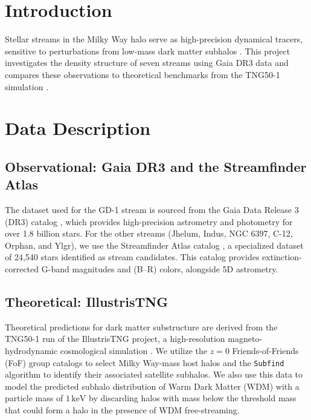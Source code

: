 \documentclass[10pt,onecolumn]{article}
\begin{document}
\section{Introduction}
\vspace{-0.1cm}
Stellar streams in the Milky Way halo serve as high-precision dynamical tracers, sensitive to perturbations from low-mass dark matter subhalos \citep{Bonaca2025}. This project investigates the density structure of seven streams using Gaia DR3 data \citep{Vallenari2023} and compares these observations to theoretical benchmarks from the TNG50-1 simulation \citep{Nelson2019}.

\section{Data Description}

\subsection{Observational: Gaia DR3 and the Streamfinder Atlas}

The dataset used for the GD-1 stream \citep{Grillmair2006,Price2018} is sourced from the Gaia Data Release 3 (DR3) catalog \citep{Vallenari2023}, which provides high-precision astrometry and photometry for over 1.8 billion stars. For the other streams (Jhelum, Indus, NGC 6397, C-12, Orphan, and Ylgr), we use the Streamfinder Atlas catalog \citep{Malhan2018, Ibata2024}, a specialized dataset of 24,540 stars identified as stream candidates. This catalog provides extinction-corrected G-band magnitudes and (B--R) colors, alongside 5D astrometry.

\subsection{Theoretical: IllustrisTNG}

Theoretical predictions for dark matter substructure are derived from the TNG50-1 run of the IllustrisTNG project, a high-resolution magneto-hydrodynamic cosmological simulation \citep{Nelson2019}. We utilize the $z=0$ Friends-of-Friends (FoF) group catalogs to select Milky Way-mass host halos and the \texttt{Subfind} algorithm to identify their associated satellite subhalos. We also use this data to model the predicted subhalo distribution of Warm Dark Matter (WDM) with a particle mass of $1\,\text{keV}$ by discarding halos with mass below the threshold mass that could form a halo in the presence of WDM free-streaming.
\end{document}
